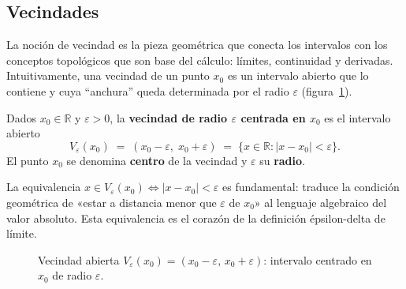 \subsection{Vecindades}

La noción de vecindad es la pieza geométrica que conecta los intervalos con los
conceptos topológicos que son base del cálculo: límites, continuidad y
derivadas. Intuitivamente, una vecindad de un punto $x_0$ es un intervalo
abierto que lo contiene y cuya ``anchura'' queda determinada por el radio
$\varepsilon$ (figura~\ref{fig:vecindad}).

\begin{definition}\label{def:vecindad}
Dados $x_0 \in \mathbb{R}$ y $\varepsilon > 0$, la \textbf{vecindad de radio
$\varepsilon$ centrada en $x_0$} es el intervalo abierto
\[
   V_\varepsilon(x_0) \;=\; (x_0 - \varepsilon,\; x_0 + \varepsilon)
   \;=\; \{x \in \mathbb{R} : |x - x_0| < \varepsilon\}.
\]
El punto $x_0$ se denomina \textbf{centro} de la vecindad y $\varepsilon$ su
\textbf{radio}.
\end{definition}

\begin{rem}
La equivalencia $x \in V_\varepsilon(x_0) \iff |x - x_0| < \varepsilon$ es
fundamental: traduce la condición geométrica de «estar a distancia menor que
$\varepsilon$ de $x_0$» al lenguaje algebraico del valor absoluto. Esta
equivalencia es el corazón de la definición épsilon-delta de límite.
\end{rem}

\begin{figure}[!htbp]
\centering
{}
\caption{Vecindad abierta $V_\varepsilon(x_0) = (x_0-\varepsilon,\,
x_0+\varepsilon)$: intervalo centrado en $x_0$ de radio $\varepsilon$.}
\label{fig:vecindad}
\end{figure}

